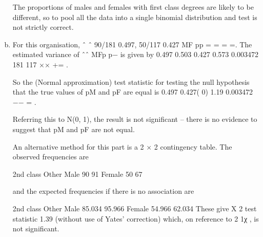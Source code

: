 \documentclass[a4paper,12pt]{article}
\begin{document}
\begin{enumerate}[(a)]
The proportions of males and females with first class degrees are likely to be different, so to pool all the data into a single binomial distribution and test is not strictly correct. 
 
 
 

 
 
\item  For this organisation, ˆ ˆ 90/181 0.497, 50/117 0.427 MF pp = = = =.  The estimated variance of ˆˆ MFp p− is given by 
 0.497 0.503 0.427 0.573 0.003472 181 117 ×× += . 
 
So the (Normal approximation) test statistic for testing the null hypothesis that the true values of pM and pF are equal is 
 0.497 0.427( 0) 1.19 0.003472 −− = . 
 
Referring this to N(0, 1), the result is not significant  –  there is no evidence to suggest that pM and pF are not equal. 
 
 
 
An alternative method for this part is a 2 × 2 contingency table.  The observed frequencies are 
 
 2nd class Other Male 90 91 Female 50 67 
 
and the expected frequencies if there is no association are 
 
 2nd class Other Male 85.034 95.966 Female 54.966 62.034 
 These give X 2 test statistic 1.39 (without use of Yates' correction) which, on reference to 2 1χ , is not significant. 

\end{enumerate} 
\end{document}

